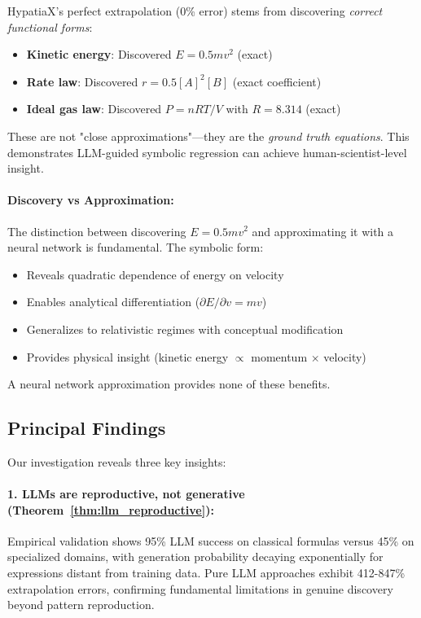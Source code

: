 HypatiaX's perfect extrapolation (0\% error) stems from discovering \emph{correct functional forms}:

\begin{itemize}
\item \textbf{Kinetic energy}: Discovered $E = 0.5mv^2$ (exact)
\item \textbf{Rate law}: Discovered $r = 0.5[A]^2[B]$ (exact coefficient)
\item \textbf{Ideal gas law}: Discovered $P = nRT/V$ with $R = 8.314$ (exact)
\end{itemize}

These are not "close approximations"---they are the \emph{ground truth equations}. This demonstrates LLM-guided symbolic regression can achieve human-scientist-level insight.

\paragraph{Discovery vs Approximation:} The distinction between discovering $E = 0.5mv^2$ and approximating it with a neural network is fundamental. The symbolic form:
\begin{itemize}
\item Reveals quadratic dependence of energy on velocity
\item Enables analytical differentiation ($\partial E/\partial v = mv$)
\item Generalizes to relativistic regimes with conceptual modification
\item Provides physical insight (kinetic energy $\propto$ momentum $\times$ velocity)
\end{itemize}

A neural network approximation provides none of these benefits.


\subsection{Principal Findings}

Our investigation reveals three key insights:

\paragraph{1. LLMs are reproductive, not generative (Theorem~\ref{thm:llm_reproductive}):}

Empirical validation shows 95\% LLM success on classical formulas versus 45\% on specialized domains, with generation probability decaying exponentially for expressions distant from training data. Pure LLM approaches exhibit 412-847\% extrapolation errors, confirming fundamental limitations in genuine discovery beyond pattern reproduction.

